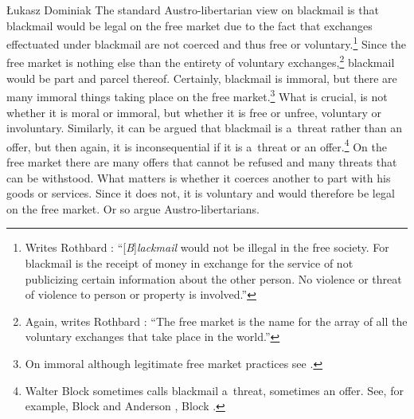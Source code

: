 \begin{artengenv}{Łukasz Dominiak}
\lettrine[loversize=0.13,lines=2,lraise=-0.03,nindent=0em,findent=0.2pt]%
{T}{}he standard Austro-libertarian view on blackmail is that blackmail would be legal on the free market due to the fact that exchanges effectuated under blackmail are not coerced and thus free or voluntary.\footnote{Writes Rothbard 
\parencite*[][p.183]{rothbard_man_2009}: %
 ``[\textit{B}]\textit{lackmail} would not be illegal in the free society. For blackmail is the receipt of money in exchange for the service of not publicizing certain information about the other person. No violence or threat of violence to person or property is involved.'' } Since the free market is nothing else than the entirety of voluntary exchanges,\footnote{Again, writes Rothbard 
\parencite*[][p.320]{rothbard_toward_2011}: %
 ``The free market is the name for the array of all the voluntary exchanges that take place in the world.'' } blackmail would be part and parcel thereof. Certainly, blackmail is immoral, but there are many immoral things taking place on the free market.\footnote{On immoral although legitimate free market practices see 
\parencite[][]{block_defending_2018}.%
} What is crucial, is not whether it is moral or immoral, but whether it is free or unfree, voluntary or involuntary. Similarly, it can be argued that blackmail is a~threat rather than an offer, but then again, it is inconsequential if it is a~threat or an offer.\footnote{Walter Block sometimes calls blackmail a~threat, sometimes an offer. See, for example, Block and Anderson 
\parencite*[][p.546]{block_blackmail_2000}, %
 Block 
\parencite*[][p.218]{block_libertarian_1998}.%
} On the free market there are many offers that cannot be refused and many threats that can be withstood. What matters is whether it coerces another to part with his goods or services. Since it does not, it is voluntary and would therefore be legal on the free market. Or so argue Austro-libertarians.




\end{artengenv}
